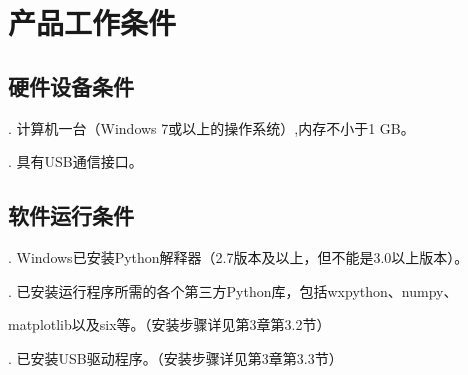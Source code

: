 \chapter{\heiti 产品工作条件}
\section{\heiti 硬件设备条件}

. 计算机一台（Windows 7或以上的操作系统）,内存不小于1 GB。

. 具有USB通信接口。

\section{\heiti 软件运行条件}

. Windows已安装Python解释器（2.7版本及以上，但不能是3.0以上版本）。



. 已安装运行程序所需的各个第三方Python库，包括wxpython、numpy、

\hspace{-0.2em}matplotlib以及six等。（安装步骤详见第3章第3.2节）

. 已安装USB驱动程序。（安装步骤详见第3章第3.3节）
